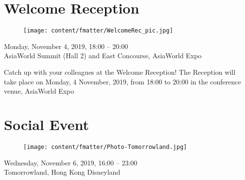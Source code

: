 \section[Welcome Reception]{Welcome Reception}
\newcommand{\receptiondaydateyear}{Monday, November 4, 2019}
\setheaders{}{}

\begin{figure}[ht!]
\centering
\texttt{[image: content/fmatter/WelcomeRec\_pic.jpg]}
\end{figure}


\begin{center}



\receptiondaydateyear, 18:00 -- 20:00 \vspace{1em}\\
AsiaWorld Summit (Hall 2) and East Concourse, AsiaWorld Expo\\
\end{center}

\noindent 
Catch up with your colleagues at the Welcome Reception! The Reception will take place on Monday, 4 November, 2019, from 18:00 to 20:00 in the conference venue, AsiaWorld Expo

\clearpage

\section[Social Event]{Social Event}
\newcommand{\socialeventdaydateyear}{Wednesday, November 6, 2019}
\setheaders{}{}

\begin{figure}[ht!]
\centering
\texttt{[image: content/fmatter/Photo-Tomorrowland.jpg]}
\end{figure}


\begin{center}



\socialeventdaydateyear, 16:00 -- 23:00 \vspace{1em}\\
Tomorrowland, Hong Kong Disneyland\\
\end{center}

